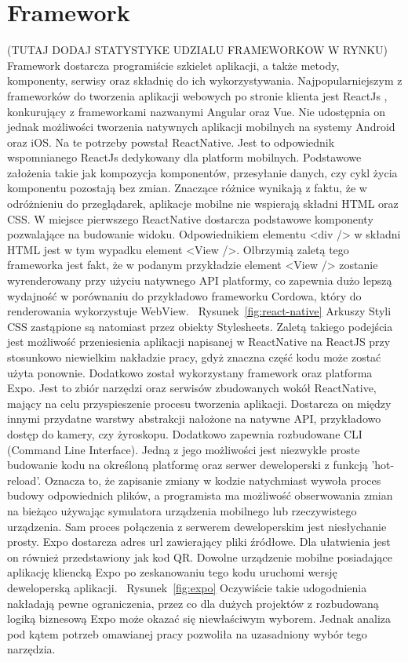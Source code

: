 \documentclass[skorowidz,skroty]{dyplomWEZUT}
\begin{document}
\section{Framework}\label{sec: framework}
(TUTAJ DODAJ STATYSTYKE UDZIALU FRAMEWORKOW W RYNKU)
Framework dostarcza programiście szkielet aplikacji, a także metody, komponenty, serwisy oraz składnię do ich wykorzystywania. Najpopularniejszym z frameworków do tworzenia aplikacji webowych po stronie klienta jest ReactJs %
, konkurujący z frameworkami nazwanymi Angular oraz Vue. Nie udostępnia on jednak możliwości tworzenia natywnych aplikacji mobilnych na systemy Android oraz iOS. Na te potrzeby powstał ReactNative. Jest to odpowiednik wspomnianego ReactJs dedykowany dla platform mobilnych. Podstawowe założenia takie jak kompozycja komponentów, przesyłanie danych, czy cykl życia komponentu pozostają bez zmian. Znaczące różnice wynikają z faktu, że w odróżnieniu do przeglądarek, aplikacje mobilne nie wspierają składni HTML oraz CSS. W miejsce pierwszego ReactNative dostarcza podstawowe komponenty pozwalające na budowanie widoku. Odpowiednikiem elementu <div /> w składni HTML jest w tym wypadku element <View />. Olbrzymią zaletą tego frameworka jest fakt, że w podanym przykładzie element <View /> zostanie wyrenderowany przy użyciu natywnego API platformy, co zapewnia dużo lepszą wydajność w porównaniu do przykładowo frameworku Cordowa, który do renderowania wykorzystuje WebView. ~Rysunek~\ref{fig:react-native} Arkuszy Styli CSS zastąpione są natomiast przez obiekty Stylesheets. Zaletą takiego podejścia jest możliwość przeniesienia aplikacji napisanej w ReactNative na ReactJS przy stosunkowo niewielkim nakładzie pracy, gdyż znaczna część kodu może zostać użyta ponownie.
Dodatkowo został wykorzystany framework oraz platforma Expo. Jest to zbiór narzędzi oraz serwisów zbudowanych wokół ReactNative, mający na celu przyspieszenie procesu tworzenia aplikacji. Dostarcza on między innymi przydatne warstwy abstrakcji nałożone na natywne API, przykładowo dostęp do kamery, czy żyroskopu. Dodatkowo zapewnia rozbudowane CLI (Command Line Interface). Jedną z jego możliwości jest niezwykle proste budowanie kodu na określoną platformę oraz serwer deweloperski z funkcją 'hot-reload'. Oznacza to, że zapisanie zmiany w kodzie natychmiast wywoła proces budowy odpowiednich plików, a programista ma możliwość obserwowania zmian na bieżąco używając symulatora urządzenia mobilnego lub rzeczywistego urządzenia. Sam proces połączenia z serwerem deweloperskim jest niesłychanie prosty. Expo dostarcza adres url zawierający pliki źródłowe. Dla ułatwienia jest on również przedstawiony jak kod QR. Dowolne urządzenie mobilne posiadające aplikację kliencką Expo po zeskanowaniu tego kodu uruchomi wersję deweloperską aplikacji. ~Rysunek~\ref{fig:expo} Oczywiście takie udogodnienia nakładają pewne ograniczenia, przez co dla dużych projektów z rozbudowaną logiką biznesową Expo może okazać się niewłaściwym wyborem. Jednak analiza pod kątem potrzeb omawianej pracy pozwoliła na uzasadniony wybór tego narzędzia.
\end{document}
